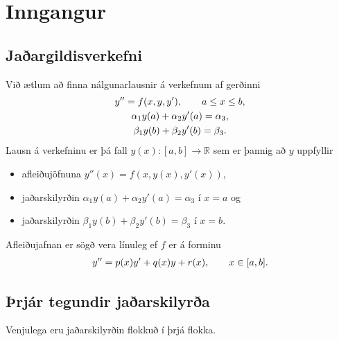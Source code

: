 \documentclass[letterpaper,10pt,icelandic]{sphinxmanual}
\begin{document}
\section{Inngangur}
\label{kafli07:inngangur}

\subsection{Jaðargildisverkefni}
\label{kafli07:id1}
Við ætlum að finna nálgunarlausnir á verkefnum af gerðinni
\begin{gather}
\begin{split}\begin{gathered}
    y''=f(x,y,y'), \qquad a\leq x\leq b,\\
\alpha_1y(a)+\alpha_2 y'(a)=\alpha_3,\\
\beta_1 y(b)+\beta_2y'(b)=\beta_3.
  \end{gathered}\end{split}\notag
\end{gather}
Lausn á verkefninu er þá fall \(y(x):[a,b]\to \mathbb R\) sem er þannig að \(y\)
uppfyllir
\begin{itemize}
\item {} 
afleiðujöfnuna \(y''(x) = f(x,y(x),y'(x))\),

\item {} 
jaðarskilyrðin \(\alpha_1y(a)+\alpha_2 y'(a)=\alpha_3\) í \(x=a\) og

\item {} 
jaðarskilyrðin \(\beta_1 y(b)+\beta_2y'(b)=\beta_3\) í \(x=b\).

\end{itemize}

Afleiðujafnan er sögð vera línuleg ef \(f\) er á forminu
\begin{gather}
\begin{split}y''=p(x)y'+q(x)y+r(x), \qquad x\in [a,b].\end{split}\notag
\end{gather}

\subsection{Þrjár tegundir jaðarskilyrða}
\label{kafli07:index-1}\label{kafli07:rjar-tegundir-jaarskilyra}
Venjulega eru jaðarskilyrðin flokkuð í þrjá flokka.
\end{document}
